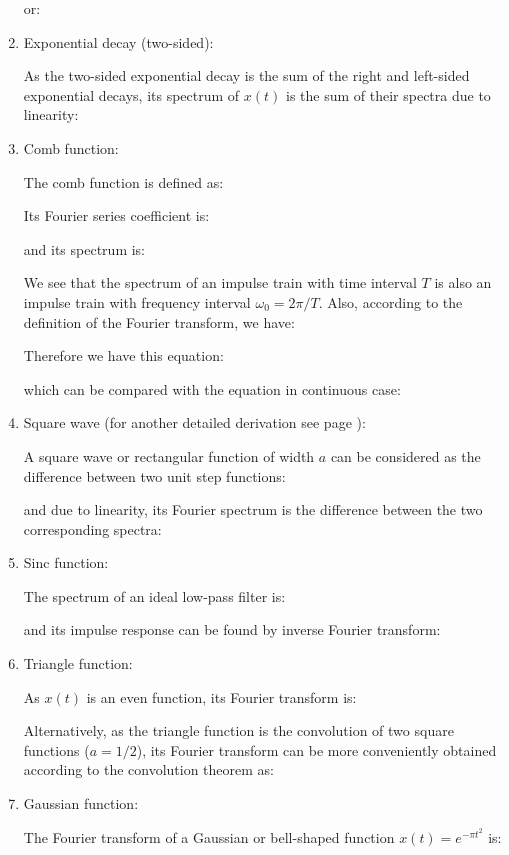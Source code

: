 \begin{enumerate}
	or:
	
	
	\item Exponential decay (two-sided):
	
	As the two-sided exponential decay is the sum of the right and left-sided 
	exponential decays, its spectrum of $x(t)$ is the sum of their spectra due 
	to linearity:
	
	
	\item Comb function:
	
	The comb function is defined as:
	
	Its Fourier series coefficient is:
	
	and its spectrum is:
	
	We see that the spectrum of an impulse train with time interval $T$ is also an impulse train with frequency interval $\omega_0=2\pi/T$. Also, according to the definition of the Fourier transform, we have:
	
	Therefore we have this equation:
	
	which can be compared with the equation in continuous case:
	
	
	
	\item Square wave (for another detailed derivation see page \pageref{fourier transform pulse square}):
	
	A square wave or rectangular function of width $a$ can be considered as the  difference between two unit step functions:
	
	and due to linearity, its Fourier spectrum is the difference between 
	the two corresponding spectra:
	
	
	\item Sinc function:
	
	The spectrum of an ideal low-pass filter is:
	
	and its impulse response can be found by inverse Fourier transform:
	
	
	\item Triangle function:
	
	As $x(t)$ is an even function, its Fourier transform is:
	
	Alternatively, as the triangle function is the convolution of two square functions
	($a=1/2$), its Fourier transform can be more conveniently obtained according to the
	convolution theorem as: 
	
	
	\item Gaussian function:
	
	The Fourier transform of a Gaussian or bell-shaped function $x(t)=e^{-\pi t^2}$ is:
	

\end{enumerate}
